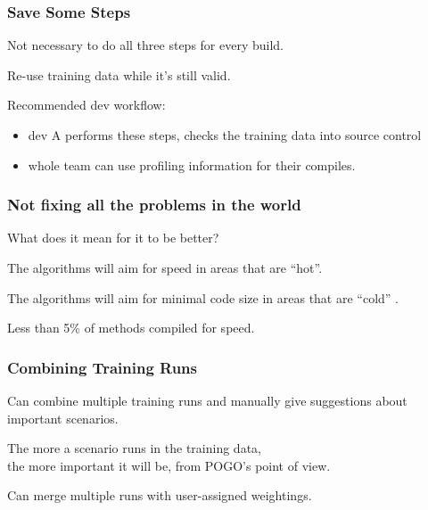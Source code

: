 \begin{frame}
\frametitle{Save Some Steps}



Not necessary to do all three steps for every build. 

Re-use training data while it's still valid.

Recommended dev workflow:
\begin{itemize}
\item dev A performs these steps, checks the training data into source control
\item whole team can use profiling information for their compiles.
\end{itemize}


\end{frame}



\begin{frame}
\frametitle{Not fixing all the problems in the world}



What does it mean for it to be better? 

The algorithms will aim for speed in areas that are ``hot''. 

The algorithms will aim for minimal code size in areas that are ``cold'' .

Less than 5\% of methods compiled for speed.

\end{frame}



\begin{frame}
\frametitle{Combining Training Runs}



Can combine multiple training runs and manually give suggestions about important scenarios.

The more a scenario runs in the training data, \\
the more important it will be, from POGO's point of view.

Can merge multiple runs with user-assigned weightings.


\end{frame}



